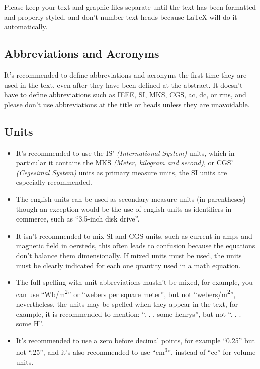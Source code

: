 \documentclass[letterpaper, 10pt, conference]{IEEEtran} %
\begin{document}
	Please keep your text and graphic files separate until the text has been formatted and properly styled, and don't number text heads because {\LaTeX} will do it automatically.
	
	\subsection{Abbreviations and Acronyms} \label{subsectionAbbreviationsAndAcronyms}
	It's recommended to define abbreviations and acronyms the first time they are used in the text, even after they have been defined at the abstract. It doesn't have to define abbreviations such as IEEE, SI, MKS, CGS, ac, dc, or rms, and please don't use abbreviations at the title or heads unless they are unavoidable.
	
	\subsection{Units} \label{subsectionUnits}
	\begin{itemize}
		\item It's recommended to use the IS' \emph{(International System)} units, which in particular it contains the MKS \emph{(Meter, kilogram and second)}, or CGS' \emph{(Cegesimal System)} units as primary measure units, the SI units are especially recommended.
		\item The english units can be used as secondary measure units (in parentheses) though an exception would be the use of english units as identifiers in commerce, such as ``3.5-inch disk drive''.
		\item It isn't recommended to mix SI and CGS units, such as current in amps and magnetic field in oersteds, this often leads to confusion because the equations don't balance them dimensionally. If mixed units must be used, the units must be clearly indicated for each one quantity used in a math equation.
		\item The full spelling with unit abbreviations mustn't be mixed, for example, you can use ``Wb/m\textsuperscript{2}'' or ``webers per square meter'', but not ``webers/m\textsuperscript {2}'', nevertheless, the units may be spelled when they appear in the text, for example, it is recommended to mention: ``. . . some henrys'', but not ``. . . some H''.
		\item It's recommended to use a zero before decimal points, for example ``0.25'' but not ``.25'', and it's also recommended to use ``cm\textsuperscript{3}'', instead of ``cc'' for volume units.
	\end{itemize}
	
\end{document}
